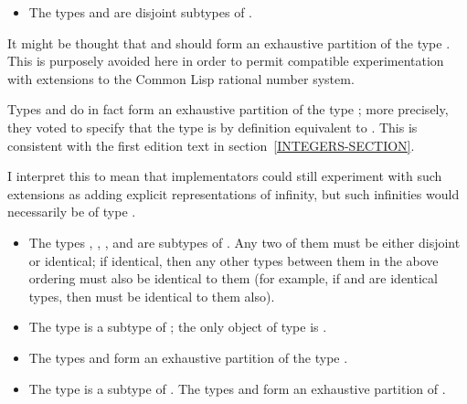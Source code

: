 \begin{itemize}
\item
The types  and  are disjoint subtypes of .
\end{itemize}

\beforenoterule
\begin{rationale}
It might be thought that  and  should
form an exhaustive partition of the type .  This is purposely
avoided here in order to permit compatible experimentation with extensions
to the Common Lisp rational number system.
\end{rationale}
\afternoterule

Types  and 
do in fact form an exhaustive partition of the type ; more precisely,
they voted to specify that the type  is by definition equivalent
to .  This is consistent with the
first edition text in section~\ref{INTEGERS-SECTION}.

I interpret this to mean that implementators could still experiment with
such extensions as adding explicit representations of infinity, but such infinities
would necessarily be of type .

\begin{itemize}
\item
The types , , , and
 are subtypes of .  Any two of them must be
either disjoint or identical; if identical, then any other types between
them in the above ordering must also be identical to them
(for example, if  and  are identical types,
then  must be identical to them also).

\item
The type  is a subtype of ; the only object of type
 is {\nil}.

\item
The types  and  form an exhaustive partition of the type
.
\end{itemize}

\begin{itemize}
\item
The type  is a subtype of .
The types  and 
form an exhaustive partition of .
\end{itemize}


